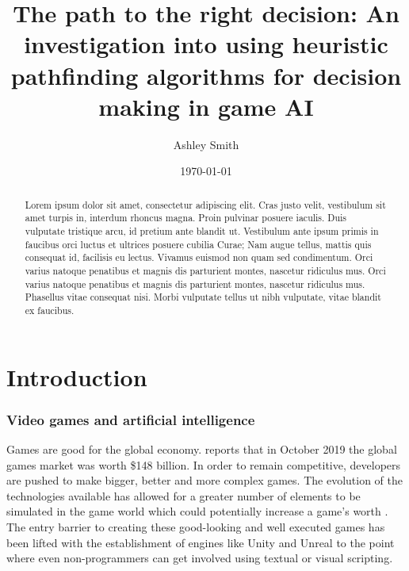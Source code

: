\documentclass[11pt, a4paper]{article}
\begin{document}
\title{\titlefont The path to the right decision: An investigation into using heuristic pathfinding algorithms for decision making in game AI}
\author{Ashley Smith}
\date{\today}
\maketitle
\thispagestyle{empty}

\renewcommand\abstractname{\textbf{Abstract}}
\begin{abstract}
Lorem ipsum dolor sit amet, consectetur adipiscing elit. Cras justo velit, vestibulum sit amet turpis in, interdum rhoncus magna. Proin pulvinar posuere iaculis. Duis vulputate tristique arcu, id pretium ante blandit ut. Vestibulum ante ipsum primis in faucibus orci luctus et ultrices posuere cubilia Curae; Nam augue tellus, mattis quis consequat id, facilisis eu lectus. Vivamus euismod non quam sed condimentum. Orci varius natoque penatibus et magnis dis parturient montes, nascetur ridiculus mus. Orci varius natoque penatibus et magnis dis parturient montes, nascetur ridiculus mus. Phasellus vitae consequat nisi. Morbi vulputate tellus ut nibh vulputate, vitae blandit ex faucibus.
\end{abstract}

\cleardoublepage
\setcounter{page}{1}
\tableofcontents

\cleardoublepage
{}
\setcounter{page}{1}
\section{Introduction}

\subsubsection{Video games and artificial intelligence}

Games are good for the global economy. \citeauthor{Newzoo} \parencite*{Newzoo} reports that in October 2019 the global games market was worth \$148 billion. In order to remain competitive, developers are pushed to make bigger, better and more complex games. The evolution of the technologies available has allowed for a greater number of elements to be simulated in the game world which could potentially increase a game's worth \parencite{blow2004game}. The entry barrier to creating these good-looking and well executed games has been lifted with the establishment of engines like Unity \parencite{Unity} and Unreal \parencite{Unreal} to the point where even non-programmers can get involved using textual or visual scripting.
\end{document}
